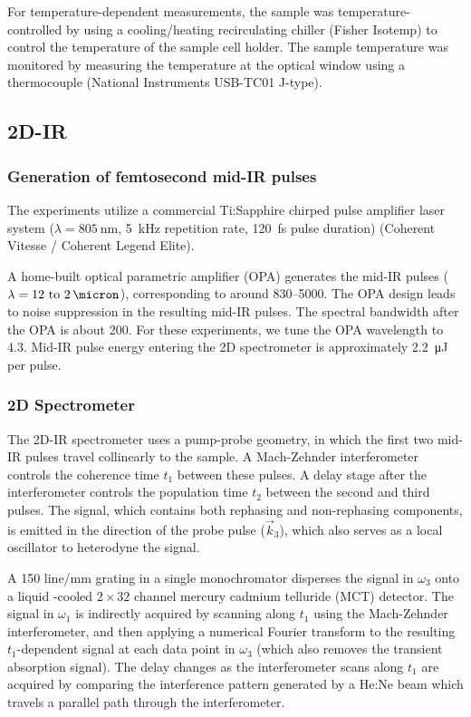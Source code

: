 {For temperature-dependent measurements, the sample was temperature-controlled by using a cooling/heating recirculating chiller (Fisher Isotemp) to control the temperature of the sample cell holder. The sample temperature was monitored by measuring the temperature at the optical window using a thermocouple (National Instruments USB-TC01 J-type).

\subsection{2D-IR}
\label{sec:anions_methods_tdir}

\subsubsection{Generation of femtosecond mid-IR pulses}
\label{sec:anions_methods_tdir_generation}
The experiments utilize a commercial Ti:Sapphire chirped pulse amplifier laser system (\(\lambda = \SI{805}{\nm}\), \SI{5}{\kilo\hertz} repetition rate, \SI{120}{\fs} pulse duration) (Coherent Vitesse / Coherent Legend Elite).

A home-built optical parametric amplifier (OPA) generates the mid-IR pulses (\(\lambda = \SIrange{12}{2}{\micron}\)), corresponding to around \SIrange{830}{5000}{\wavenumber}. The OPA design leads to noise suppression in the resulting mid-IR pulses.\cite{Hamm2000} The spectral bandwidth after the OPA is about \SI{200}{\wavenumber}. For these experiments, we tune the OPA wavelength to \SI{4.3}{\micron}. Mid-IR pulse energy entering the 2D spectrometer is approximately \SI{2.2}{\micro\joule} per pulse.

\subsubsection{2D Spectrometer}
\label{sec:anions_methods_tdir_spectrometer}
The 2D-IR spectrometer uses a pump-probe geometry,\cite{Helbing2010} in which the first two mid-IR pulses travel collinearly to the sample. A Mach-Zehnder interferometer controls the coherence time \(t_1\) between these pulses. A delay stage after the interferometer controls the population time \(t_2\) between the second and third pulses. The signal, which contains both rephasing and non-rephasing components, is emitted in the direction of the probe pulse (\(\vec{k}_3\)), which also serves as a local oscillator to heterodyne the signal.

A 150 line/mm grating in a single monochromator disperses the signal in \(\omega_3\) onto a liquid -cooled \(2 \times 32\) channel mercury cadmium telluride (MCT) detector. The signal in \(\omega_1\) is indirectly acquired by scanning along \(t_1\) using the Mach-Zehnder interferometer, and then applying a numerical Fourier transform to the resulting \(t_1\)-dependent signal at each data point in \(\omega_3\) (which also removes the transient absorption signal). The delay changes as the interferometer scans along \(t_1\) are acquired by comparing the interference pattern generated by a He:Ne beam which travels a parallel path through the interferometer.

}
